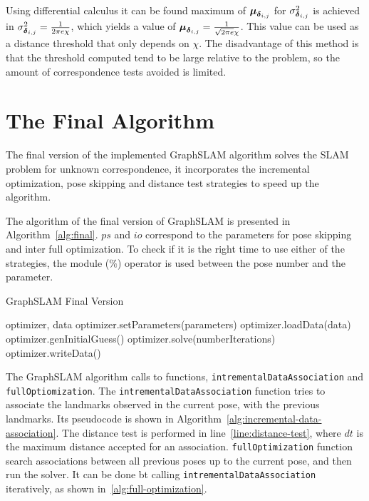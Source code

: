 Using differential calculus it can be found maximum of $\boldsymbol{\mu}_{\boldsymbol{\delta}_{i,j}}$ for $\sigma_{\boldsymbol{\delta}_{i,j}}^2$ is achieved in $\sigma_{\boldsymbol{\delta}_{i,j}}^2 = \frac{1}{2\pi e\chi}$, which yields a value of $\boldsymbol{\mu}_{\boldsymbol{\delta}_{i,j}} = \frac{1}{\sqrt{2\pi e}\chi}$.  
This value can be used as a  distance threshold that only depends on $\chi$. The disadvantage of this method is that the threshold computed tend to be large relative to the problem, so the amount of correspondence tests avoided is limited.

\section{The Final Algorithm}

The final version of the implemented GraphSLAM algorithm solves the SLAM problem for unknown correspondence, it incorporates the incremental optimization, pose skipping and  distance test strategies to speed up the algorithm.

The algorithm of the final version of GraphSLAM is presented in Algorithm~\ref{alg:final}. $ps$ and $io$ correspond to the parameters for pose skipping and inter full optimization. To check if it is the right time to use either of the strategies, the module ($\%$) operator is used between the pose number and the parameter. 

\begin{algorithm}[htbp!]
    \caption{GraphSLAM Final Version}
    \label{alg:final}
    \begin{algorithmic}[1]
        \Require optimizer, data
        \State optimizer.setParameters(parameters)
        \State optimizer.loadData(data)
        \State optimizer.genInitialGuess()
        \State
        \State {}
        \State optimizer.solve(numberIterations)
        \EndIf
        \State {}
        \EndIf
        \EndFor
        \State
        \State optimizer.writeData()
    \end{algorithmic}
\end{algorithm}

The GraphSLAM algorithm calls to functions, \texttt{intremental\-Data\-Association} and \texttt{full\-Optiomization}. The \texttt{intrementalDataAssociation} function tries to associate the landmarks observed in the current pose, with the previous landmarks. Its pseudocode is shown in Algorithm~\ref{alg:incremental-data-association}. The distance test is performed in line~\ref{line:distance-test}, where $dt$ is the maximum distance accepted for an association. \texttt{full\-Optimization} function search associations between all previous poses up to the current pose, and then run the solver. It can be done bt calling \texttt{intremental\-Data\-Association} iteratively, as shown in~\ref{alg:full-optimization}.


